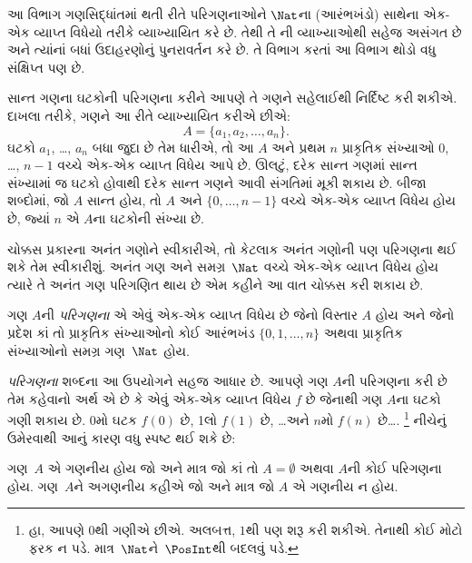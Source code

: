 \begingroup
\makeatletter{}\makeatother


\label{guunit:OLP-0038}


\begin{editorial}
  આ વિભાગ ગણસિદ્ધાંતમાં થતી રીતે પરિગણનાઓને $\Nat$ના
  (આરંભખંડો) સાથેના એક-એક વ્યાપ્ત વિધેયો તરીકે વ્યાખ્યાયિત કરે છે.
  તેથી તે ની વ્યાખ્યાઓથી સહેજ અસંગત છે અને ત્યાંનાં
  બધાં ઉદાહરણોનું પુનરાવર્તન કરે છે. તે વિભાગ કરતાં આ વિભાગ થોડો
  વધુ સંક્ષિપ્ત પણ છે.
\end{editorial}

સાન્ત ગણના ઘટકોની પરિગણના કરીને આપણે તે ગણને સહેલાઈથી
નિર્દિષ્ટ કરી શકીએ. દાખલા તરીકે, ગણને આ રીતે વ્યાખ્યાયિત કરીએ છીએ:
\[
  A = \{a_1, a_2, \ldots, a_n\}.
\]
ઘટકો $a_1$, \dots, $a_n$ બધા જુદા છે તેમ ધારીએ, તો આ
$A$ અને પ્રથમ $n$ પ્રાકૃતિક સંખ્યાઓ $0$, \dots, $n-1$ વચ્ચે
એક-એક વ્યાપ્ત વિધેય આપે છે. ઊલટું, દરેક સાન્ત ગણમાં સાન્ત સંખ્યામાં જ
ઘટકો હોવાથી દરેક સાન્ત ગણને આવી સંગતિમાં મૂકી શકાય છે.
બીજા શબ્દોમાં, જો $A$ સાન્ત હોય, તો $A$ અને $\{0, \dots, n-1\}$
વચ્ચે એક-એક વ્યાપ્ત વિધેય હોય છે, જ્યાં $n$ એ $A$ના ઘટકોની સંખ્યા છે.

ચોક્કસ પ્રકારના અનંત ગણોને સ્વીકારીએ, તો કેટલાક અનંત ગણોની પણ
પરિગણના થઈ શકે તેમ સ્વીકારીશું. અનંત ગણ અને સમગ્ર~$\Nat$ વચ્ચે
એક-એક વ્યાપ્ત વિધેય હોય ત્યારે તે અનંત ગણ પરિગણિત થાય છે એમ કહીને આ
વાત ચોક્કસ કરી શકાય છે.

\begin{defn}
ગણ $A$ની \emph{પરિગણના} એ એવું એક-એક વ્યાપ્ત વિધેય છે જેનો વિસ્તાર
$A$ હોય અને જેનો પ્રદેશ કાં તો પ્રાકૃતિક સંખ્યાઓનો કોઈ આરંભખંડ
$\{0, 1, \ldots, n\}$ {અથવા} પ્રાકૃતિક સંખ્યાઓનો સમગ્ર ગણ~$\Nat$ હોય.
\end{defn}

\begin{explain}
\emph{પરિગણના} શબ્દના આ ઉપયોગને સહજ આધાર છે. આપણે ગણ $A$ની
પરિગણના કરી છે તેમ કહેવાનો અર્થ એ છે કે એવું એક-એક વ્યાપ્ત વિધેય $f$
છે જેનાથી ગણ $A$ના ઘટકો ગણી શકાય છે. $0$મો ઘટક $f(0)$ છે,
1લો $f(1)$ છે, \ldots અને $n$મો $f(n)$ છે\ldots.
\footnote{હા, આપણે $0$થી ગણીએ છીએ. અલબત્ત, $1$થી પણ શરૂ કરી
શકીએ. તેનાથી કોઈ મોટો ફરક ન પડે. માત્ર~$\Nat$ને~$\PosInt$થી
બદલવું પડે.} નીચેનું ઉમેરવાથી આનું કારણ વધુ સ્પષ્ટ થઈ શકે છે:
\end{explain}

\begin{defn}
  ગણ~$A$ એ ગણનીય હોય જો અને માત્ર જો કાં તો
  $A = \emptyset$ અથવા $A$ની કોઈ પરિગણના હોય. ગણ~$A$ને
  અગણનીય કહીએ જો અને માત્ર જો $A$ એ ગણનીય ન હોય.
\end{defn}

